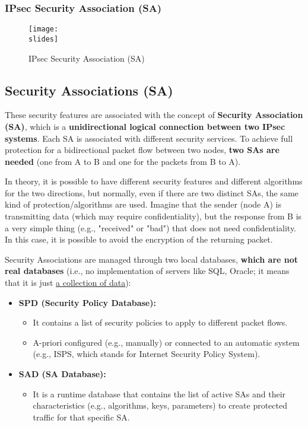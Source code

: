 \subsubsection{IPsec Security Association (SA)}

\begin{figure}[h]
    \centering
    \texttt{[image: \\slides]}
    \caption{IPsec Security Association (SA)}
    \label{fig:ipsec-sa}
\end{figure}

\subsection{Security Associations (SA)}

These security features are associated with the concept of \textbf{Security Association (SA)}, which is a \textbf{unidirectional logical connection between two IPsec systems}. Each SA is associated with different security services. To achieve full protection for a bidirectional packet flow between two nodes, \textbf{two SAs are needed} (one from A to B and one for the packets from B to A).

In theory, it is possible to have different security features and different algorithms for the two directions, but normally, even if there are two distinct SAs, the same kind of protection/algorithms are used.
Imagine that the sender (node A) is transmitting data (which may require confidentiality), but the response from B is a very simple thing (e.g., "received" or "bad") that does not need confidentiality. In this case, it is possible to avoid the encryption of the returning packet.

Security Associations are managed through two local databases, \textbf{which are not real databases}
(i.e., no implementation of servers like SQL, Oracle; it means that it is just \ul{a collection of data}):


\begin{itemize}
    \item \textbf{SPD (Security Policy Database):}
          \begin{itemize}
              \item It contains a list of security policies to apply to different packet flows.
              \item A-priori configured (e.g., manually) or connected to an automatic system (e.g., ISPS, which stands for Internet Security Policy System).
          \end{itemize}
    \item \textbf{SAD (SA Database):}
          \begin{itemize}
              \item It is a runtime database that contains the list of active SAs and their characteristics (e.g., algorithms, keys, parameters) to create protected traffic for that specific SA.
          \end{itemize}
\end{itemize}

